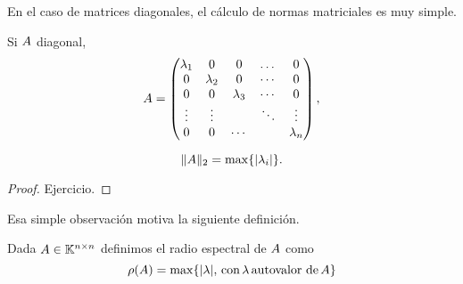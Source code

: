 En el caso de matrices diagonales, el cálculo de normas matriciales es muy simple.

\begin{prop} Si $\Ab$ diagonal,
  $$\Ab=
 \begin{pmatrix}
  \lambda_1&0&0&\dots&0\\
  0&\lambda_2&0&\cdots &0 \\
  0&0&\lambda_3 &\cdots&0 \\
  \vdots&\vdots & &\ddots&\vdots\\
  0&0&\cdots &&\lambda_n
 \end{pmatrix},
 $$

 $$
 \|\Ab\|_2 = \max\{|\lambda_i|\}.
 $$
\end{prop}
\begin{proof}
Ejercicio.
\end{proof}

Esa simple observación motiva la siguiente definición.

\tccdefi
\begin{defi}
 Dada $\Ab\in \Knn$ definimos el radio espectral de $\Ab$ como
 $$
 \rho(\Ab)=\max\{|\lambda|, \, \mbox{con}\, \lambda \,\mbox{autovalor de}\, \Ab\}
 $$
\end{defi}

